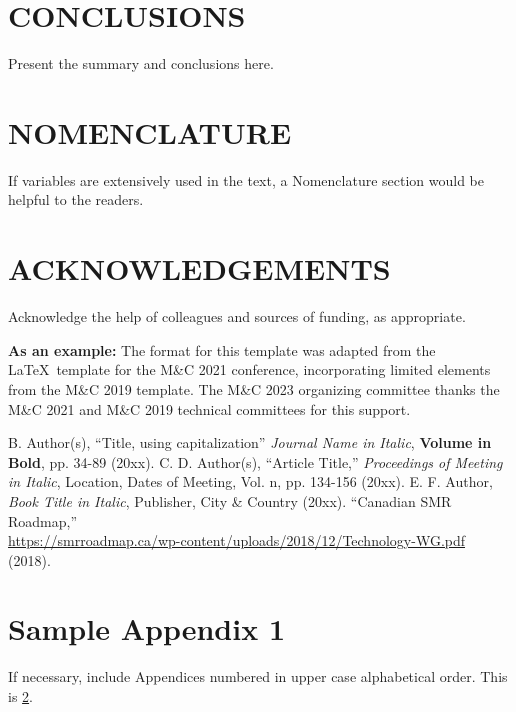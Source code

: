 \documentclass[letterpaper]{mc2023}
\begin{document}
\section{CONCLUSIONS}

Present the summary and conclusions here.

\section*{NOMENCLATURE}

If variables are extensively used in the text, a Nomenclature section would be helpful to the readers.

\section*{ACKNOWLEDGEMENTS}

Acknowledge the help of colleagues and sources of funding, as appropriate.

\textbf{As an example:} The format for this template was adapted from the \LaTeX\ template for the M\&C 2021
conference, incorporating limited elements from the M\&C 2019 template.  The M\&C 2023 organizing committee
thanks the M\&C 2021 and M\&C 2019 technical committees for this support.

\newif\ifusebibtex
\usebibtexfalse

\ifusebibtex
\setlength{\baselineskip}{12pt}


\else
\setlength{\baselineskip}{12pt}
\begin{thebibliography}{300}
 B. Author(s), ``Title, using capitalization'' \emph{Journal Name in Italic}, 
  \textbf{Volume in Bold}, pp. 34-89 (20xx).
 C. D. Author(s), ``Article Title,'' \emph{Proceedings of
  Meeting in Italic}, Location, Dates of Meeting, Vol. n, pp. 134-156 
  (20xx).
 E. F. Author, \emph{Book Title in Italic}, Publisher, City \&
  Country (20xx). 
 ``Canadian SMR Roadmap,'' \\
  \url{https://smrroadmap.ca/wp-content/uploads/2018/12/Technology-WG.pdf} (2018).
\end{thebibliography}
\fi

\appendix
\gdef\thesection{APPENDIX~\Alph{section}}
\section{Sample Appendix 1}
\label{app:a}
If necessary, include Appendices numbered in upper case alphabetical order. This is \ref{app:a}. 
\end{document}
